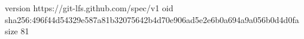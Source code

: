 version https://git-lfs.github.com/spec/v1
oid sha256:496f44d54329e587a81b32075642b4d70e906ad5e2e6b0a694a9a056b0d4d0fa
size 81
